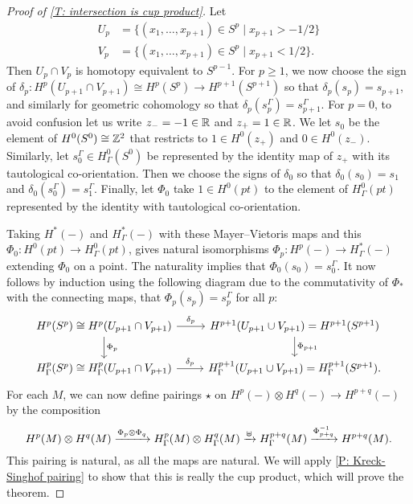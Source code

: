\begin{proof}[Proof of \cref{T: intersection is cup product}]
	Let
	\begin{align*}
		U_p& = \{(x_1,\ldots,x_{p+1}) \in S^p \mid x_{p+1}>-1/2\}\\
		V_p& = \{(x_1,\ldots,x_{p+1}) \in S^p \mid x_{p+1}<1/2\}.
	\end{align*}
	Then $U_p \cap V_p$ is homotopy equivalent to $S^{p-1}$.
	For $p\geq 1$, we now choose the sign of $\delta_p \colon H^{p}(U_{p+1} \cap V_{p+1}) \cong H^{p}(S^p) \to H^{p+1}(S^{p+1})$ so that $\delta_p(s_p) = s_{p+1}$, and similarly for geometric cohomology so that $\delta_p(s_p^\Gamma) = s_{p+1}^\Gamma$.
	For $p = 0$, to avoid confusion let us write $z_- = -1 \in \mathbb{R}$ and $z_+ = 1 \in \mathbb{R}$.
	We let $s_0$ be the element of $H^0(S^0) \cong \mathbb{Z}^2$ that restricts to $1 \in H^0(z_+)$ and $0 \in H^0(z_-)$.
	Similarly, let $s_0^\Gamma \in H^0_\Gamma(S^0)$ be represented by the identity map of $z_+$ with its tautological co-orientation.
	Then we choose the signs of $\delta_0$ so that $\delta_0(s_0) = s_{1}$ and $\delta_0(s_0^\Gamma) = s_{1}^\Gamma$.
	Finally, let $\Phi_0$ take $1 \in H^0(pt)$ to the element of $H^0_\Gamma(pt)$ represented by the identity with tautological co-orientation.

	Taking $H^*(-)$ and $H^*_\Gamma(-)$ with these Mayer--Vietoris maps and this $\Phi_0 \colon H^0(pt) \to H^0_\Gamma(pt)$, \cite[Theorem 10]{Krec10b} gives natural isomorphisms $\Phi_p \colon H^p(-) \to H^*_\Gamma(-)$ extending $\Phi_0$ on a point.
	The naturality implies that $\Phi_0(s_0) = s_0^\Gamma$.
	It now follows by induction using the following diagram due to the commutativity of $\Phi_*$ with the connecting maps, that $\Phi_p(s_p) = s_p^\Gamma$ for all $p$:
	\[
	\begin{tikzcd}
		H^p(S^p) \cong H^p(U_{p+1} \cap V_{p+1}) \arrow{r}{\delta_p} \arrow[d, "\Phi_p"] &
		H^{p+1}(U_{p+1} \cup V_{p+1}) = H^{p+1}(S^{p+1}) \arrow[d, "\Phi_{p+1}"] \\
		H^p_\Gamma(S^p) \cong H^p_\Gamma(U_{p+1} \cap V_{p+1}) \arrow{r}{\delta_p} &
		H_\Gamma^{p+1}(U_{p+1} \cup V_{p+1}) = H^{p+1}_\Gamma(S^{p+1}).
	\end{tikzcd}
	\]
	For each $M$, we can now define pairings $\star$ on $H^p(-) \otimes H^q(-) \to H^{p+q}(-)$ by the composition
	\[
	H^p(M) \otimes H^q(M) \xrightarrow{\Phi_p \otimes \Phi_q}
	H^p_\Gamma(M) \otimes H^q_\Gamma(M) \xrightarrow{\uplus}
	H^{p+q}_\Gamma(M) \xrightarrow{\Phi_{p+q}^{-1}}
	H^{p+q}(M).
	\]
	This pairing is natural, as all the maps are natural.
	We will apply \cref{P: Kreck-Singhof pairing} to show that this is really the cup product, which will prove the theorem.


\end{proof}
